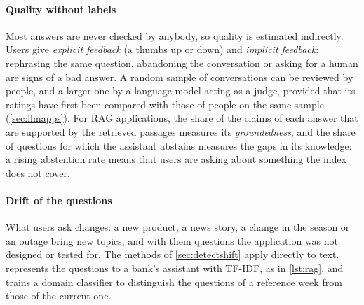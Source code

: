 \paragraph{Quality without labels} Most answers are never checked by anybody, so quality is estimated indirectly. Users give
\emph{explicit feedback} (a thumbs up or down) and \emph{implicit feedback}: rephrasing the same question, abandoning the
conversation or asking for a human are signs of a bad answer. A random sample of conversations can be reviewed by people, and
a larger one by a language model acting as a judge, provided that its ratings have first been compared with those of people on
the same sample (\cref{sec:llmapps}). For RAG applications, the share of the claims of each answer that are supported by the
retrieved passages measures its \emph{groundedness}, and the share of questions for which the assistant abstains measures the
gaps in its knowledge: a rising abstention rate means that users are asking about something the index does not cover.

\paragraph{Drift of the questions} What users ask changes: a new product, a news story, a change in the season or an outage
bring new topics, and with them questions the application was not designed or tested for. The methods of \cref{sec:detectshift}
apply directly to text.  represents the questions to a bank's assistant with TF-IDF, as in \cref{lst:rag},
and trains a domain classifier to distinguish the questions of a reference week from those of the current one.


